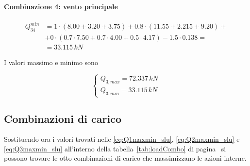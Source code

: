 \paragraph{Combinazione 4: vento principale}

\begin{align*}
	Q_{34}^{min} &= 1\cdot(8.00+3.20 + 3.75) + 0.8\cdot(11.55+2.215 + 9.20) +\\
	&+0\cdot(0.7 \cdot 7.50 + 0.7\cdot4.00+ 0.5\cdot4.17) - 1.5\cdot 0.138 =\\
	&=  33.115\,kN
\end{align*}

I valori massimo e minimo sono

\begin{equation}
		\label{eq:Q3maxmin_slu}
		\begin{cases}
			Q_{3,max} = 72.337\,kN\\
			Q_{3, min} = 33.115\,kN
		\end{cases}
\end{equation}

\subsection{Combinazioni di carico}
Sostituendo ora i valori trovati nelle \eqref{eq:Q1maxmin_slu}, \eqref{eq:Q2maxmin_slu} e \eqref{eq:Q3maxmin_slu} all'interno della tabella~\ref{tab:loadCombo} di pagina~\pageref{tab:loadCombo} si possono trovare le otto combinazioni di carico che massimizzano le azioni interne.

